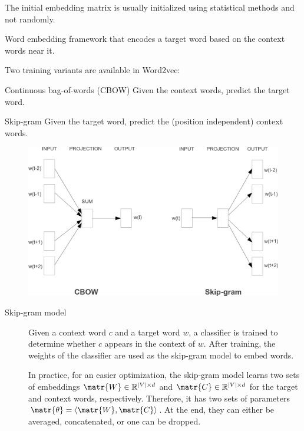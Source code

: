\begin{description}
\begin{description}
                \begin{remark}
                    The initial embedding matrix is usually initialized using statistical methods and not randomly.
                \end{remark}
        \end{description}

    \item[Word2vec] 
        Word embedding framework that encodes a target word based on the context words near it.

        Two training variants are available in Word2vec:
        \begin{descriptionlist}
            \item[Continuous bag-of-words (CBOW)]
                Given the context words, predict the target word.

            \item[Skip-gram]
                Given the target word, predict the (position independent) context words.
        \end{descriptionlist}

        \begin{figure}[H]
            \centering
            \includegraphics[width=0.45\linewidth]{./img/word2vec_alternatives.png}
        \end{figure}

        \begin{description}
            \item[Skip-gram model] 
                Given a context word $c$ and a target word $w$, a classifier is trained to determine whether $c$ appears in the context of $w$. After training, the weights of the classifier are used as the skip-gram model to embed words.

                \begin{remark}
                    In practice, for an easier optimization, the skip-gram model learns two sets of embeddings $\matr{W} \in \mathbb{R}^{|V| \times d}$ and $\matr{C} \in \mathbb{R}^{|V| \times d}$ for the target and context words, respectively. Therefore, it has two sets of parameters $\matr{\theta} = \langle\matr{W}, \matr{C}\rangle$. At the end, they can either be averaged, concatenated, or one can be dropped.
                \end{remark}


\end{description}
\end{description}

